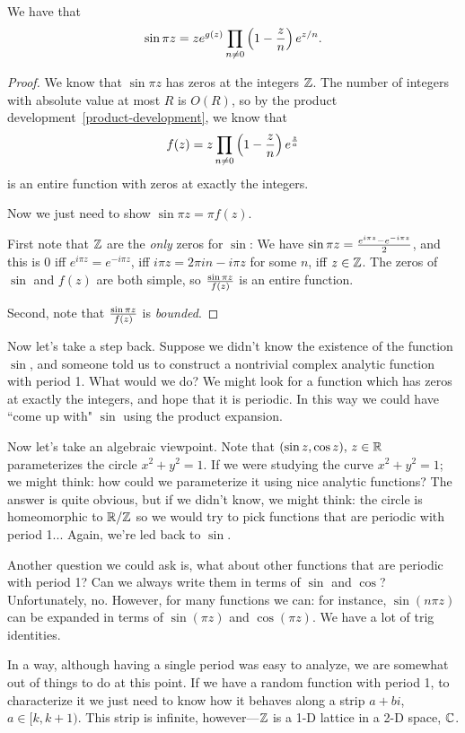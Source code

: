 \begin{thm}
We have that
\[
\sin \pi z=ze^{g(z)} \prod_{n\ne 0}\left( {1-\frac{z}{n}} \right)e^{z/n}.
\]
\end{thm}
\begin{proof}
We know that $\sin \pi z$ has zeros at the integers $\mathbb{Z}$. The number of integers with absolute value at most $R$ is $O(R)$, so by the product development~\ref{product-development}, we know that
\[
f(z)=z \prod_{n\ne 0} \left( {1-\frac{z}{n}} \right)e^{\frac{z}{a}}
\]
is an entire function with zeros at exactly the integers.

Now we just need to show $\sin \pi z=\pi f(z)$.

First note that $\mathbb{Z}$ are the {\it only} zeros for $\sin$: We have $\sin \pi z=\frac{e^{i\pi z}-e^{-i\pi z}}{2}$, and this is 0 iff $e^{i\pi z}=e^{-i\pi z}$, iff $i\pi z=2\pi in -i\pi z$ for some $n$, iff $z\in \mathbb{Z}$. The zeros of $\sin$ and $f(z)$ are both simple, so $\frac{\sin \pi z}{f(z)}$ is an entire function. 

Second, note that $\frac{\sin \pi z}{f(z)}$ is {\it bounded}. 
\end{proof}
Now let's take a step back. Suppose we didn't know the existence of the function $\sin$, and someone told us to construct a nontrivial complex analytic function with period 1. What would we do? We might look for a function which has zeros at exactly the integers, and hope that it is periodic. In this way we could have ``come up with" $\sin$ using the product expansion.

Now let's take an algebraic viewpoint. Note that $(\sin z,\cos z),\,z\in \mathbb{R}$ parameterizes the circle $x^2+y^2=1$. If we were studying the curve $x^2+y^2=1$; we might think: how could we parameterize it using nice analytic functions? The answer is quite obvious, but if we didn't know, we might think: the circle is homeomorphic to $\mathbb{R}/\mathbb{Z}$ so we would try to pick functions that are periodic with period 1... Again, we're led back to $\sin$.

Another question we could ask is, what about other functions that are periodic with period 1? Can we always write them in terms of $\sin$ and $\cos$? Unfortunately, no.  However, for many functions we can: for instance, $\sin(n\pi z)$ can be expanded in terms of $\sin(\pi z)$ and $\cos(\pi z)$. We have a lot of trig identities.

In a way, although having a single period was easy to analyze, we are somewhat out of things to do at this point. If we have a random function with period 1, to characterize it we just need to know how it behaves along a strip $a+bi$, $a\in [k,k+1)$. This strip is infinite, however---$\mathbb{Z}$ is a 1-D lattice in a 2-D space, $\mathbb{C}$.

